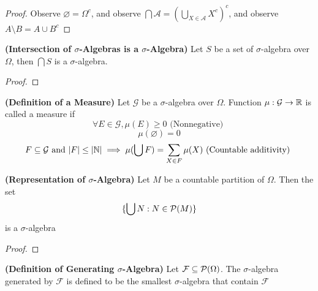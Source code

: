 \documentclass{report}
\begin{document}
\begin{proof}
Observe $\varnothing=\Omega^c$, and observe $\bigcap \mathcal{A}=(\bigcup_{X \in \mathcal{A}}X^c)^c$, and observe $A\setminus B=A\cup B^c$
\end{proof}
\begin{theorem}
\label{1.1.4}
\textbf{(Intersection of $\sigma$-Algebras is a $\sigma$-Algebra)} Let $S$ be a set of $\sigma$-algebra over $\Omega$, then $\bigcap S$ is a $\sigma$-algebra. 
\end{theorem}
\begin{proof}
\end{proof}
\begin{definition}
\label{1.1.5}
  \textbf{(Definition of a Measure)} Let $\mathcal{G}$ be a $\sigma$-algebra over $\Omega$. Function $\mu:\mathcal{G}\rightarrow \mathbb{R}$ is called a measure if
\begin{equation}
\forall E\in \mathcal{G}, \mu(E)\geq 0\text{ (Nonnegative) }
\end{equation}  
\begin{equation}
\mu(\varnothing)=0
\end{equation}
\begin{equation}
F\subseteq \mathcal{G}\text{ and }|F|\leq |\mathbb{N}|\implies \mu(\bigcup  F)=\sum_{X\in F} \mu(X)\text{ (Countable additivity) }
\end{equation}
\end{definition}
\begin{theorem}
\label{1.1.6}
\textbf{(Representation of $\sigma$-Algebra)} Let $M$ be a countable partition of $\Omega$. Then the set
\begin{equation}
\{ \bigcup N: N \in\mathcal{P}(M) \}
\end{equation}
is a $\sigma$-algebra
\end{theorem}
\begin{proof}
\end{proof}
\begin{definition}
\label{1.1.7}
\textbf{(Definition of Generating $\sigma$-Algebra)} Let $\mathcal{F}\subseteq \mathcal{P}(\Omega)$. The $\sigma$-algebra generated by $\mathcal{F}$ is defined to be the smallest  $\sigma$-algebra that contain $\mathcal{F}$
\end{definition}
\end{document}
